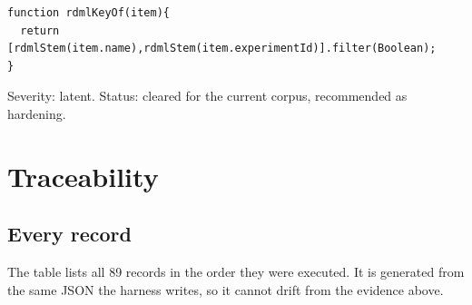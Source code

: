\begin{lstlisting}[style=js]
function rdmlKeyOf(item){
  return [rdmlStem(item.name),rdmlStem(item.experimentId)].filter(Boolean);
}
\end{lstlisting}

Severity: latent. Status: cleared for the current corpus, recommended as hardening.
\chapter{Traceability}

\section{Every record}
The table lists all 89 records in the order they were executed. It is generated from the same JSON
the harness writes, so it cannot drift from the evidence above.

